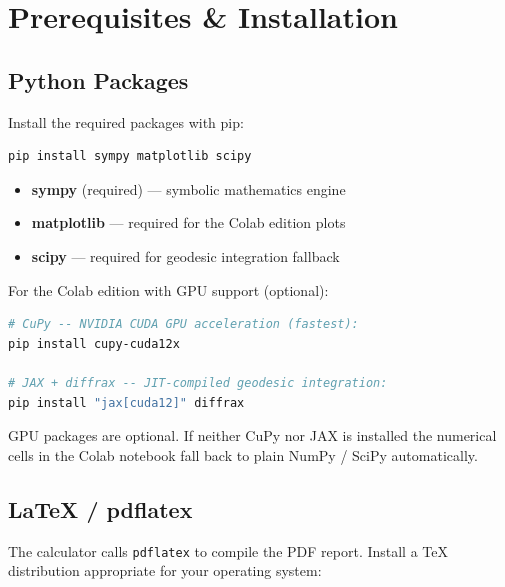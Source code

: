 \documentclass[11pt,a4paper]{article}
\newcommand{\code}[1]{\texttt{\small#1}}
\begin{document}
\section{Prerequisites \& Installation}
\label{sec:install}

\subsection{Python Packages}

Install the required packages with pip:

\begin{lstlisting}[language=bash,label={lst:pip},numbers=none]
pip install sympy matplotlib scipy
\end{lstlisting}

\begin{itemize}
  \item \textbf{sympy} (required) — symbolic mathematics engine
  \item \textbf{matplotlib} — required for the Colab edition plots
  \item \textbf{scipy} — required for geodesic integration fallback
\end{itemize}

For the Colab edition with GPU support (optional):

\begin{lstlisting}[language=bash,numbers=none]
# CuPy -- NVIDIA CUDA GPU acceleration (fastest):
pip install cupy-cuda12x

# JAX + diffrax -- JIT-compiled geodesic integration:
pip install "jax[cuda12]" diffrax
\end{lstlisting}

\begin{notebox}
  GPU packages are optional.  If neither CuPy nor JAX is installed the
  numerical cells in the Colab notebook fall back to plain NumPy / SciPy
  automatically.
\end{notebox}

\subsection{LaTeX / pdflatex}

The calculator calls \code{pdflatex} to compile the PDF report.  Install a
TeX distribution appropriate for your operating system:
\end{document}
